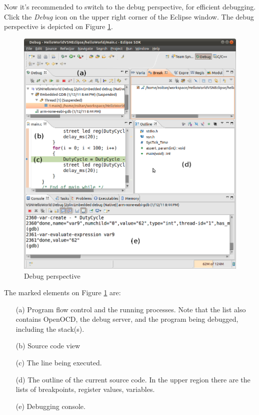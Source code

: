 \documentclass[a4paper, 10pt]{article}
\begin{document}
Now it's recommended to switch to the debug perspective,
for efficient debugging.
Click the \emph{Debug} icon on the upper right corner of the Eclipse window.
The debug perspective is depicted on Figure \ref{fig:debug-window}.


    \begin{figure}[H]
    \centering
        \includegraphics[width=\textwidth]{./install-guide-linux-images/debug-window.png}
        \caption{Debug perspective}
        \label{fig:debug-window}
    \end{figure}

The marked elements on Figure \ref{fig:debug-window} are:
    \begin{itemize}
    \item[(a)] Program flow control and the running processes.
        Note that the list also contains OpenOCD, the debug server,
        and the program being debugged, including the stack(s).
    \item[(b)] Source code view
    \item[(c)] The line being executed.
    \item[(d)] The outline of the current source code.
        In the upper region there are the lists of breakpoints, register values,
        variables.
    \item[(e)] Debugging console.
    \end{itemize}
\end{document}

